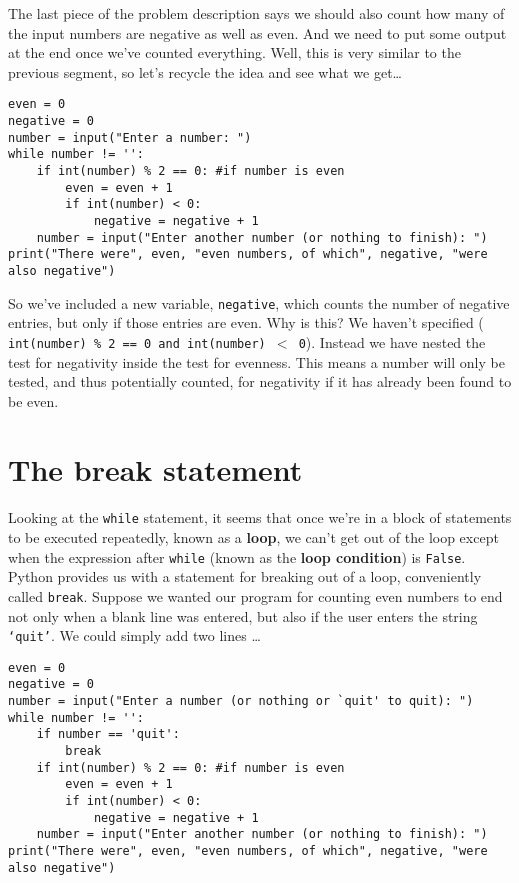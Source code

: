 The last piece of the problem description says we should also count   how many of the input numbers are negative as well as even. And we need   to put some output at the end once we've counted everything. Well, this   is very similar to the previous segment, so let's recycle the idea and   see what we get\ldots
\begin{lstlisting}
even = 0
negative = 0
number = input("Enter a number: ")
while number != '':
    if int(number) % 2 == 0: #if number is even
        even = even + 1
        if int(number) < 0:
            negative = negative + 1
    number = input("Enter another number (or nothing to finish): ")
print("There were", even, "even numbers, of which", negative, "were also negative")
\end{lstlisting}

So we've included a new variable, \texttt{negative}, which counts the   number of negative entries, but only if those entries are even. Why is   this? We haven't specified (
\texttt{int(number) \% 2 == 0 and int(number)   $<$ 0}). Instead we have nested the test for negativity inside   the test for evenness. This means a number will only be tested, and   thus potentially counted, for negativity if it has already been found   to be even.

\section{The break statement}

Looking at the \texttt{while} statement, it seems that once we're in a block   of statements to be executed repeatedly, known as a   \textbf{loop}, we can't get out of the loop except when the   expression after \texttt{while} (known as the \textbf{loop condition}) is \texttt{False}.   Python provides us with a statement for breaking out of a loop,   conveniently called \texttt{break}. Suppose we   wanted our program for counting even numbers to end not only when a   blank line was entered, but also if the user enters the string \texttt{`quit'}.   We could simply add two lines \ldots
\begin{lstlisting}
even = 0
negative = 0
number = input("Enter a number (or nothing or `quit' to quit): ")
while number != '':
    if number == 'quit':
        break
    if int(number) % 2 == 0: #if number is even
        even = even + 1
        if int(number) < 0:
            negative = negative + 1
    number = input("Enter another number (or nothing to finish): ")
print("There were", even, "even numbers, of which", negative, "were also negative")
\end{lstlisting}

